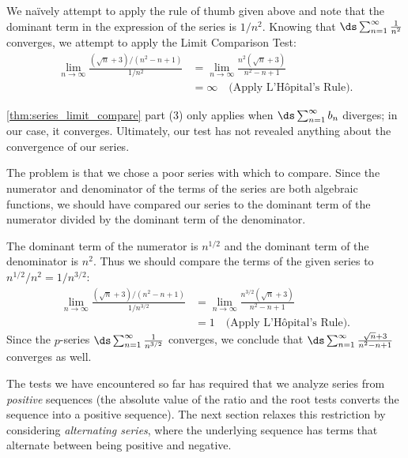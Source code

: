 {We na\"ively attempt to apply the rule of thumb given above and note that the dominant term in the expression of the series is $1/n^2$. Knowing that $\ds \sum_{n=1}^\infty \frac1{n^2}$ converges, we attempt to apply the Limit Comparison Test:
\begin{align*}
	\lim_{n\to\infty}\frac{(\sqrt{n}+3)/(n^2-n+1)}{1/n^2}
	&=\lim_{n\to\infty}\frac{n^2(\sqrt n+3)}{n^2-n+1}\\
	&= \infty \quad \text{(Apply L'H\^opital's Rule)}.
\end{align*}

\autoref{thm:series_limit_compare} part (3) only applies when $\ds\sum_{n=1}^\infty b_n$ diverges; in our case, it converges. Ultimately, our test has not revealed anything about the convergence of our series.

The problem is that we chose a poor series with which to compare. Since the numerator and denominator of the terms of the series are both algebraic functions, we should have compared our series  to the dominant term of the numerator divided by the dominant term of the denominator.

The dominant term of the numerator is $n^{1/2}$ and the dominant term of the denominator is $n^2$. Thus we should compare the terms of the given series to $n^{1/2}/n^2 = 1/n^{3/2}$:
\begin{align*}
\lim_{n\to\infty}\frac{(\sqrt{n}+3)/(n^2-n+1)}{1/n^{3/2}} &= \lim_{n\to \infty} \frac{n^{3/2}(\sqrt n+3)}{n^2-n+1} \\
		&= 1\quad \text{(Apply L'H\^opital's Rule)}.
\end{align*}
Since the  $p$-series $\ds\sum_{n=1}^\infty \frac1{n^{3/2}}$ converges, we conclude that $\ds\sum_{n=1}^\infty \frac{\sqrt{n}+3}{n^2-n+1}$ converges as well.}

The tests we have encountered so far has required that we analyze series from \emph{positive} sequences (the absolute value of the ratio and the root tests converts the sequence into a positive sequence). The next section relaxes this restriction by  considering \emph{alternating series}, where the underlying sequence has terms that alternate between being positive and negative.

